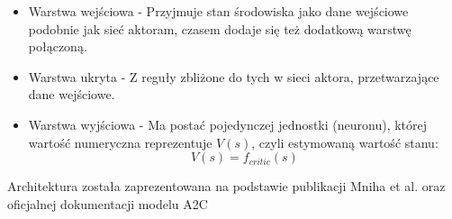 \documentclass[a4paper, 12pt]{article}
\numberwithin{equation}{section}
\begin{document}
\begin{itemize}
        \item Warstwa wejściowa - Przyjmuje stan środowiska jako dane wejściowe podobnie jak sieć aktoram, czasem dodaje się też dodatkową warstwę połączoną.
        \item Warstwa ukryta - Z reguły zbliżone do tych w sieci aktora, przetwarzające dane wejściowe.
        \item Warstwa wyjściowa - Ma postać pojedynczej jednostki (neuronu), której wartość numeryczna reprezentuje \( V(s) \), czyli estymowaną wartość stanu:
        \begin{equation}
        V(s) = f_{critic}(s) 
        \end{equation}    
    \end{itemize}
    Architektura została zaprezentowana na podstawie publikacji Mniha et al. \cite{mnih2016a3c} oraz oficjalnej dokumentacji modelu A2C \cite{stable_baselines_a2c}
\end{document}
